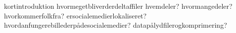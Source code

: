 kortintroduktion
hvormegetbliverderdeltaffiler
hvemdeler?
hvormangedeler?
hvorkommerfolkfra?
ersocialemedierlokaliseret?
hvordanfungerebillederpådesocialemedier?
datapålydfilerogkomprimering?